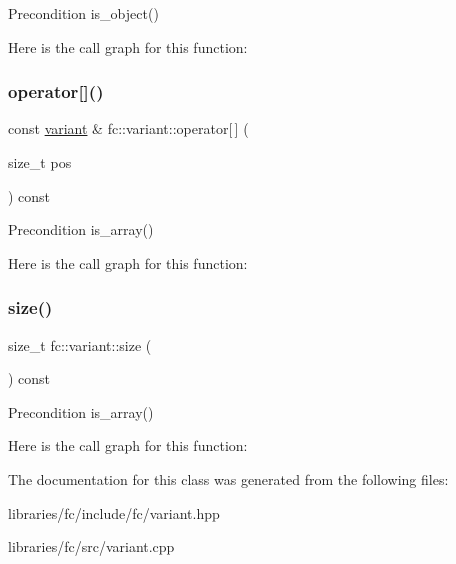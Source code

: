 \begin{DoxyPrecond}{Precondition}
is\+\_\+object() 
\end{DoxyPrecond}
Here is the call graph for this function\+:
\mbox{\label{classfc_1_1variant_af88be0a0533f9d58f36d88339d42f9fd}} 
\subsubsection{\texorpdfstring{operator[]()}{operator[]()}\hspace{0.1cm}{\footnotesize\ttfamily [2/2]}}
{\footnotesize\ttfamily const \mbox{\hyperlink{classfc_1_1variant}{variant}} \& fc\+::variant\+::operator\mbox{[}$\,$\mbox{]} (\begin{DoxyParamCaption}\item[{size\+\_\+t}]{pos }\end{DoxyParamCaption}) const}

\begin{DoxyPrecond}{Precondition}
is\+\_\+array() 
\end{DoxyPrecond}
Here is the call graph for this function\+:
\mbox{\label{classfc_1_1variant_a67f6416c5dd1b9c53b4b20b73f9cd117}} 
\subsubsection{\texorpdfstring{size()}{size()}}
{\footnotesize\ttfamily size\+\_\+t fc\+::variant\+::size (\begin{DoxyParamCaption}{ }\end{DoxyParamCaption}) const}

\begin{DoxyPrecond}{Precondition}
is\+\_\+array() 
\end{DoxyPrecond}
Here is the call graph for this function\+:


The documentation for this class was generated from the following files\+:\begin{DoxyCompactItemize}
\item 
libraries/fc/include/fc/variant.\+hpp\item 
libraries/fc/src/variant.\+cpp\end{DoxyCompactItemize}
